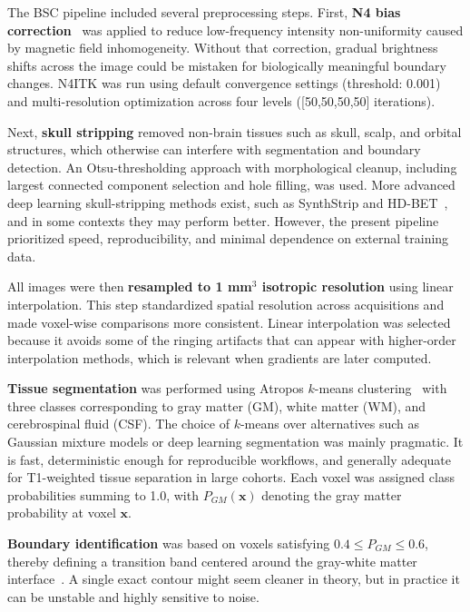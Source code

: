 \documentclass[blue]{ludusofficial}  %
\begin{document}
The BSC pipeline included several preprocessing steps. First, \textbf{N4 bias correction}~\cite{tustison2010n4} was applied to reduce low-frequency intensity non-uniformity caused by magnetic field inhomogeneity. Without that correction, gradual brightness shifts across the image could be mistaken for biologically meaningful boundary changes. N4ITK was run using default convergence settings (threshold: 0.001) and multi-resolution optimization across four levels ([50,50,50,50] iterations).

Next, \textbf{skull stripping} removed non-brain tissues such as skull, scalp, and orbital structures, which otherwise can interfere with segmentation and boundary detection. An Otsu-thresholding approach with morphological cleanup, including largest connected component selection and hole filling, was used. More advanced deep learning skull-stripping methods exist, such as SynthStrip and HD-BET~\cite{hoopes2022synthstrip}, and in some contexts they may perform better. However, the present pipeline prioritized speed, reproducibility, and minimal dependence on external training data.

All images were then \textbf{resampled to 1 mm$^3$ isotropic resolution} using linear interpolation. This step standardized spatial resolution across acquisitions and made voxel-wise comparisons more consistent. Linear interpolation was selected because it avoids some of the ringing artifacts that can appear with higher-order interpolation methods, which is relevant when gradients are later computed.

\textbf{Tissue segmentation} was performed using Atropos $k$-means clustering~\cite{avants2011atropos} with three classes corresponding to gray matter (GM), white matter (WM), and cerebrospinal fluid (CSF). The choice of $k$-means over alternatives such as Gaussian mixture models or deep learning segmentation was mainly pragmatic. It is fast, deterministic enough for reproducible workflows, and generally adequate for T1-weighted tissue separation in large cohorts. Each voxel was assigned class probabilities summing to 1.0, with $P_{GM}(\mathbf{x})$ denoting the gray matter probability at voxel $\mathbf{x}$.

\textbf{Boundary identification} was based on voxels satisfying $0.4 \leq P_{GM} \leq 0.6$, thereby defining a transition band centered around the gray-white matter interface~\cite{olafson2021bsc}. A single exact contour might seem cleaner in theory, but in practice it can be unstable and highly sensitive to noise. 
\end{document}
